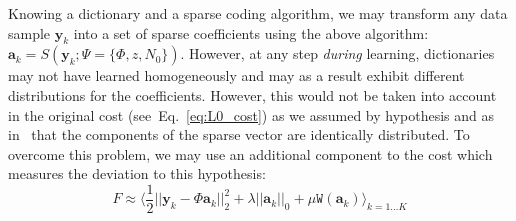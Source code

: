 \documentclass[vision,article,submit,oneauthor,pdftex]{Definitions/mdpi}
\newcommand{\coef}{\mathbf{a}} %
\newcommand{\image}{\mathbf{y}} %
\newcommand{\dico}{\Phi} %
\newcommand{\norm}[1]{|\!| #1 |\!|}
\newcommand{\seeEq}[1]{Eq.~\ref{eq:#1}}%
\begin{document}
\begin{figure}
{%
\label{fig:HEH}}%
\end{figure}%
Knowing a dictionary and a sparse coding algorithm, we may transform any data sample $\image_k$ into a set of sparse coefficients using the above algorithm: $\coef_{k} = S(\image_k; \Psi=\{\dico, z, N_0\})$. However, at any step \emph{during} learning, dictionaries may not have learned homogeneously and may as a result exhibit different distributions for the coefficients. 
However, this would not be taken into account in the original cost (see~\seeEq{L0_cost}) as we assumed by hypothesis and as in~\cite{Olshausen97} that the components of the sparse vector are identically distributed. To overcome this problem, we may use an additional component to the cost which measures the deviation to this hypothesis: 
\begin{equation}%
F \approx  \langle \frac{1}{2} \norm{\image_k - \dico \coef_{k}}_2^2 + \lambda\norm{\coef_{k}}_0 + \mu\texttt{W}(\coef_{k}) \rangle_{k = 1 \ldots K}%
\label{eq:L0_cost_full}%
\end{equation}%
\end{document}
